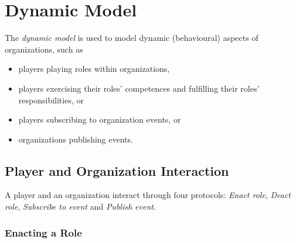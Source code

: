 
\section{Dynamic Model}

The \textit{dynamic model} is used to model dynamic (behavioural) aspects of organizations, such as
\begin{itemize}
	\item players playing roles within organizations,
	\item players exercising their roles' competences and fulfilling their roles' responsibilities, or
	\item players subscribing to organization events, or
	\item organizations publishing events.
\end{itemize}

\subsection{Player and Organization Interaction}

A player and an organization interact through four protocols: \textit{Enact role}, \textit{Deact role}, \textit{Subscribe to event} and \textit{Publish event}.

\subsubsection{Enacting a Role}

